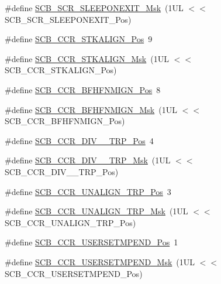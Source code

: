 \begin{DoxyCompactItemize}
\item 
\#define \hyperlink{group___c_m_s_i_s___s_c_b_ga50a243e317b9a70781b02758d45b05ee}{S\+C\+B\+\_\+\+S\+C\+R\+\_\+\+S\+L\+E\+E\+P\+O\+N\+E\+X\+I\+T\+\_\+\+Msk}~(1\+U\+L $<$$<$ S\+C\+B\+\_\+\+S\+C\+R\+\_\+\+S\+L\+E\+E\+P\+O\+N\+E\+X\+I\+T\+\_\+\+Pos)
\item 
\#define \hyperlink{group___c_m_s_i_s___s_c_b_gac2d20a250960a432cc74da59d20e2f86}{S\+C\+B\+\_\+\+C\+C\+R\+\_\+\+S\+T\+K\+A\+L\+I\+G\+N\+\_\+\+Pos}~9
\item 
\#define \hyperlink{group___c_m_s_i_s___s_c_b_ga33cf22d3d46af158a03aad25ddea1bcb}{S\+C\+B\+\_\+\+C\+C\+R\+\_\+\+S\+T\+K\+A\+L\+I\+G\+N\+\_\+\+Msk}~(1\+U\+L $<$$<$ S\+C\+B\+\_\+\+C\+C\+R\+\_\+\+S\+T\+K\+A\+L\+I\+G\+N\+\_\+\+Pos)
\item 
\#define \hyperlink{group___c_m_s_i_s___s_c_b_ga4010a4f9e2a745af1b58abe1f791ebbf}{S\+C\+B\+\_\+\+C\+C\+R\+\_\+\+B\+F\+H\+F\+N\+M\+I\+G\+N\+\_\+\+Pos}~8
\item 
\#define \hyperlink{group___c_m_s_i_s___s_c_b_ga89a28cc31cfc7d52d9d7a8fcc69c7eac}{S\+C\+B\+\_\+\+C\+C\+R\+\_\+\+B\+F\+H\+F\+N\+M\+I\+G\+N\+\_\+\+Msk}~(1\+U\+L $<$$<$ S\+C\+B\+\_\+\+C\+C\+R\+\_\+\+B\+F\+H\+F\+N\+M\+I\+G\+N\+\_\+\+Pos)
\item 
\#define \hyperlink{group___c_m_s_i_s___s_c_b_gac8d512998bb8cd9333fb7627ddf59bba}{S\+C\+B\+\_\+\+C\+C\+R\+\_\+\+D\+I\+V\+\_\+\_\+\+T\+R\+P\+\_\+\+Pos}~4
\item 
\#define \hyperlink{group___c_m_s_i_s___s_c_b_gabb9aeac71b3abd8586d0297070f61dcb}{S\+C\+B\+\_\+\+C\+C\+R\+\_\+\+D\+I\+V\+\_\+\_\+\+T\+R\+P\+\_\+\+Msk}~(1\+U\+L $<$$<$ S\+C\+B\+\_\+\+C\+C\+R\+\_\+\+D\+I\+V\+\_\+\_\+\+T\+R\+P\+\_\+\+Pos)
\item 
\#define \hyperlink{group___c_m_s_i_s___s_c_b_gac4e4928b864ea10fc24dbbc57d976229}{S\+C\+B\+\_\+\+C\+C\+R\+\_\+\+U\+N\+A\+L\+I\+G\+N\+\_\+\+T\+R\+P\+\_\+\+Pos}~3
\item 
\#define \hyperlink{group___c_m_s_i_s___s_c_b_ga68c96ad594af70c007923979085c99e0}{S\+C\+B\+\_\+\+C\+C\+R\+\_\+\+U\+N\+A\+L\+I\+G\+N\+\_\+\+T\+R\+P\+\_\+\+Msk}~(1\+U\+L $<$$<$ S\+C\+B\+\_\+\+C\+C\+R\+\_\+\+U\+N\+A\+L\+I\+G\+N\+\_\+\+T\+R\+P\+\_\+\+Pos)
\item 
\#define \hyperlink{group___c_m_s_i_s___s_c_b_ga789e41f45f59a8cd455fd59fa7652e5e}{S\+C\+B\+\_\+\+C\+C\+R\+\_\+\+U\+S\+E\+R\+S\+E\+T\+M\+P\+E\+N\+D\+\_\+\+Pos}~1
\item 
\#define \hyperlink{group___c_m_s_i_s___s_c_b_ga4cf59b6343ca962c80e1885710da90aa}{S\+C\+B\+\_\+\+C\+C\+R\+\_\+\+U\+S\+E\+R\+S\+E\+T\+M\+P\+E\+N\+D\+\_\+\+Msk}~(1\+U\+L $<$$<$ S\+C\+B\+\_\+\+C\+C\+R\+\_\+\+U\+S\+E\+R\+S\+E\+T\+M\+P\+E\+N\+D\+\_\+\+Pos)

\end{DoxyCompactItemize}
